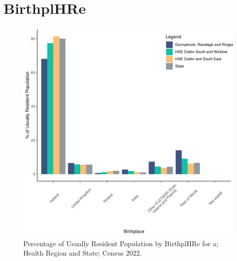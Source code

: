 \documentclass{article}
\begin{document}
\section{BirthplHRe}\label{sect:Birth}
\begin{figure}[H]
	\centering
	\includegraphics[width = 130mm]{../figures/BirthED.pdf}
	\caption{Percentage of Usually Resident Population by BirthplHRe for a; Health Region and State; Census 2022.}
	\label{fig:vbnv}
	\end{figure}
	
\end{document}
